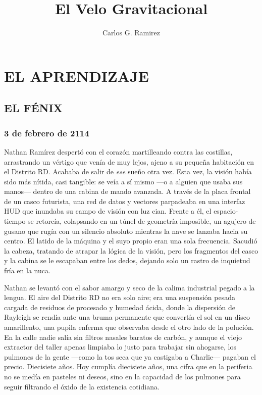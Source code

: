 \documentclass[11pt,twoside]{book}
\title{\textbf{El Velo Gravitacional}}
\author{Carlos G. Ramirez}
\date{} %
\begin{document}
\maketitle

\frontmatter
\tableofcontents

\mainmatter


\part{EL APRENDIZAJE}

\chapter{EL FÉNIX}

\section*{3 de febrero de 2114}

Nathan Ramírez despertó con el corazón martilleando contra las costillas, arrastrando un vértigo que venía de muy lejos, ajeno a su pequeña habitación en el Distrito RD. Acababa de salir de \textit{ese} sueño otra vez. Esta vez, la visión había sido más nítida, casi tangible: se veía a sí mismo ---o a alguien que usaba sus manos--- dentro de una cabina de mando avanzada. A través de la placa frontal de un casco futurista, una red de datos y vectores parpadeaba en una interfaz HUD que inundaba su campo de visión con luz cian. Frente a él, el espacio-tiempo se retorcía, colapsando en un túnel de geometría imposible, un agujero de gusano que rugía con un silencio absoluto mientras la nave se lanzaba hacia su centro. El latido de la máquina y el suyo propio eran una sola frecuencia. Sacudió la cabeza, tratando de atrapar la lógica de la visión, pero los fragmentos del casco y la cabina se le escapaban entre los dedos, dejando solo un rastro de inquietud fría en la nuca.

Nathan se levantó con el sabor amargo y seco de la calima industrial pegado a la lengua. El aire del Distrito RD no era solo aire; era una suspensión pesada cargada de residuos de procesado y humedad ácida, donde la dispersión de Rayleigh se rendía ante una bruma permanente que convertía el sol en un disco amarillento, una pupila enferma que observaba desde el otro lado de la polución. En la calle nadie salía sin filtros nasales baratos de carbón, y aunque el viejo extractor del taller apenas limpiaba lo justo para trabajar sin ahogarse, los pulmones de la gente ---como la tos seca que ya castigaba a Charlie--- pagaban el precio. Diecisiete años. Hoy cumplía diecisiete años, una cifra que en la periferia no se medía en pasteles ni deseos, sino en la capacidad de los pulmones para seguir filtrando el óxido de la existencia cotidiana.
\end{document}
